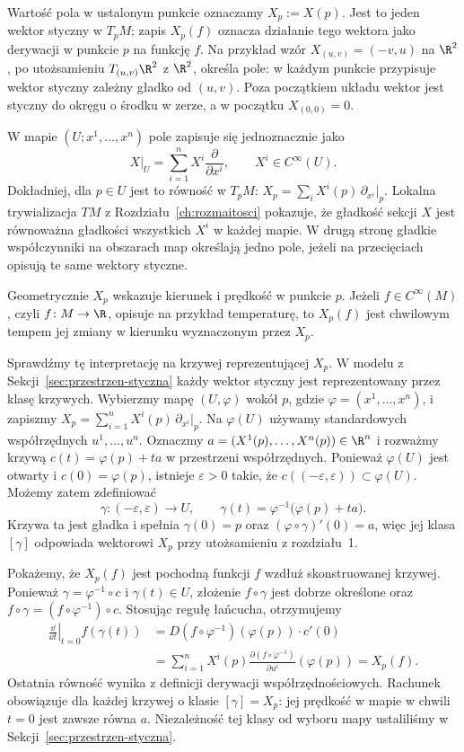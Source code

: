 Wartość pola w ustalonym punkcie oznaczamy $X_p:=X(p)$.
Jest to jeden wektor styczny w $T_pM$; zapis $X_p(f)$ oznacza
działanie tego wektora jako derywacji w punkcie $p$ na funkcję $f$.
Na przykład wzór $X_{(u,v)}=(-v,u)$ na $\R^2$, po utożsamieniu
$T_{(u,v)}\R^2$ z $\R^2$, określa pole:
w każdym punkcie przypisuje wektor styczny zależny gładko od $(u,v)$.
Poza początkiem układu wektor jest styczny do okręgu o środku w zerze,
a w początku $X_{(0,0)}=0$.

W mapie $(U;x^1,\ldots,x^n)$ pole zapisuje się jednoznacznie jako
\begin{equation}\label{eq:lokalne-pole}
 X\big|_U=\sum_{i=1}^{n}X^i\frac{\partial}{\partial x^i},
 \qquad X^i\in C^\infty(U).
\end{equation}
Dokładniej, dla $p\in U$ jest to równość w $T_pM$:
$X_p=\sum_iX^i(p)\,\partial_{x^i}|_p$.
Lokalna trywializacja $TM$ z Rozdziału~\ref{ch:rozmaitosci}
pokazuje, że gładkość sekcji $X$ jest równoważna gładkości
wszystkich $X^i$ w każdej mapie. W drugą stronę gładkie współczynniki
na obszarach map określają jedno pole, jeżeli na przecięciach
opisują te same wektory styczne.

Geometrycznie $X_p$ wskazuje kierunek i prędkość w punkcie $p$.
Jeżeli $f\in C^\infty(M)$, czyli $f\colon M\to\R$,
opisuje na przykład temperaturę, to $X_p(f)$ jest chwilowym
tempem jej zmiany w kierunku wyznaczonym przez $X_p$.

Sprawdźmy tę interpretację na krzywej reprezentującej $X_p$.
W modelu z Sekcji~\ref{sec:przestrzen-styczna} każdy wektor
styczny jest reprezentowany przez klasę krzywych.
Wybierzmy mapę $(U,\varphi)$ wokół $p$, gdzie
$\varphi=(x^1,\ldots,x^n)$, i zapiszmy
$X_p=\sum_{i=1}^n X^i(p)\,\partial_{x^i}|_p$.
Na $\varphi(U)$ używamy standardowych współrzędnych
$u^1,\ldots,u^n$.
Oznaczmy $a=(X^1(p),\ldots,X^n(p))\in\R^n$ i rozważmy
krzywą $c(t)=\varphi(p)+ta$ w przestrzeni współrzędnych.
Ponieważ $\varphi(U)$ jest otwarty i $c(0)=\varphi(p)$,
istnieje $\varepsilon>0$ takie, że
$c((-\varepsilon,\varepsilon))\subset\varphi(U)$.
Możemy zatem zdefiniować
\[
\gamma\colon(-\varepsilon,\varepsilon)\to U,
\qquad
\gamma(t)=\varphi^{-1}\bigl(\varphi(p)+ta\bigr).
\]
Krzywa ta jest gładka i spełnia $\gamma(0)=p$ oraz
$(\varphi\circ\gamma)'(0)=a$, więc jej klasa $[\gamma]$
odpowiada wektorowi $X_p$ przy utożsamieniu
z rozdziału~1.

Pokażemy, że $X_p(f)$ jest pochodną funkcji $f$
wzdłuż skonstruowanej krzywej. Ponieważ
$\gamma=\varphi^{-1}\circ c$ i $\gamma(t)\in U$,
złożenie $f\circ\gamma$ jest dobrze określone oraz
$f\circ\gamma=(f\circ\varphi^{-1})\circ c$.
Stosując regułę łańcucha, otrzymujemy
\[
\begin{aligned}
\left.\frac{\dd}{\dd t}\right|_{t=0}f(\gamma(t))
&=D(f\circ\varphi^{-1})(\varphi(p))\cdot c'(0)\\
&=\sum_{i=1}^n X^i(p)
  \frac{\partial(f\circ\varphi^{-1})}{\partial u^i}
  (\varphi(p))
=X_p(f).
\end{aligned}
\]
Ostatnia równość wynika z definicji derywacji
współrzędnościowych. Rachunek obowiązuje dla każdej krzywej
o klasie $[\gamma]=X_p$: jej prędkość w mapie w chwili $t=0$
jest zawsze równa $a$. Niezależność tej klasy od wyboru mapy
ustaliliśmy w Sekcji~\ref{sec:przestrzen-styczna}.

